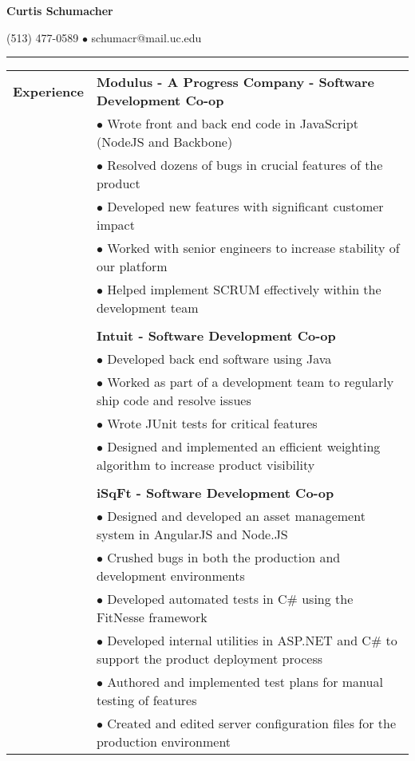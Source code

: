 \documentclass[11pt]{article} %
\begin{document}
	\huge{\centerline{\textbf{Curtis Schumacher}}}
	\large
	\centerline{(513) 477-0589 $\bullet$ schumacr@mail.uc.edu}
	\vspace*{1\baselineskip}\hrule\vspace*{1\baselineskip}
\begin{small}	
	\begin{tabular}[t]{p{3cm} p{16cm}}\large{\textbf{Experience}} 	
 	  			& \textbf{Modulus - A Progress Company - Software Development Co-op} \color{gray}{April 2015 - Present} \\
 	  			& $\bullet$ Wrote front and back end code in JavaScript (NodeJS and Backbone) \\
 	  			& $\bullet$ Resolved dozens of bugs in crucial features of the product \\
 	  			& $\bullet$ Developed new features with significant customer impact \\
				& $\bullet$ Worked with senior engineers to increase stability of our platform \\
				& $\bullet$ Helped implement SCRUM effectively within the development team\\
				& \\
				& \textbf{Intuit - Software Development Co-op} \color{gray}{January - April 2015} \\
 	  			& $\bullet$ Developed back end software using Java \\
 	  			& $\bullet$ Worked as part of a development team to regularly ship code and resolve issues \\
 	  			& $\bullet$ Wrote JUnit tests for critical features \\
				& $\bullet$ Designed and implemented an efficient weighting algorithm to increase product visibility \\
				& \\ 
				& \textbf{iSqFt - Software Development Co-op} \color{gray}{Spring/Fall 2013, and Summer 2014}  \\
 	   			& $\bullet$ Designed and developed an asset management system in AngularJS and Node.JS \\
 	  			& $\bullet$ Crushed bugs in both the production and development environments \\
 	  			& $\bullet$ Developed automated tests in C\# using the FitNesse framework		\\
 	  			& $\bullet$ Developed internal utilities in ASP.NET and C\# to support the product deployment process \\ 
 	  			& $\bullet$ Authored and implemented test plans for manual testing of features			\\
 	  			& $\bullet$ Created and edited server configuration files for the production environment \\
			\end{tabular}
			

\end{small}
\end{document}
